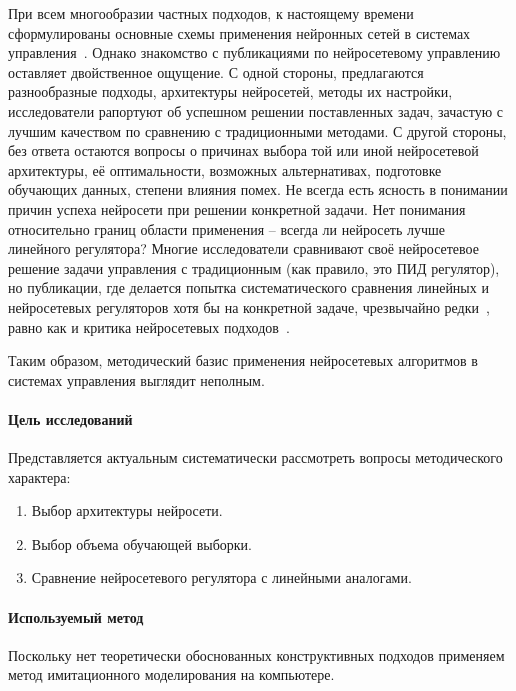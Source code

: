 При всем многообразии частных подходов, к настоящему времени
сформулированы основные схемы применения нейронных сетей в системах
управления~\cite{narpart92,park96,suykens96,terehov99,sigom00}.
Однако знакомство с публикациями по нейросетевому управлению оставляет
двойственное ощущение.  С одной стороны, предлагаются разнообразные
подходы, архитектуры нейросетей, методы их настройки, исследователи
рапортуют об успешном решении поставленных задач, зачастую с лучшим
качеством по сравнению с традиционными методами.  С другой стороны,
без ответа остаются вопросы о причинах выбора той или иной
нейросетевой архитектуры, её оптимальности, возможных альтернативах,
подготовке обучающих данных, степени влияния помех.  Не всегда есть
ясность в понимании причин успеха нейросети при решении конкретной
задачи.  Нет понимания относительно границ области применения --
всегда ли нейросеть лучше линейного регулятора?  Многие исследователи
сравнивают своё нейросетевое решение задачи управления с традиционным
(как правило, это ПИД регулятор), но публикации, где делается попытка
систематического сравнения линейных и нейросетевых регуляторов хотя бы
на конкретной задаче, чрезвычайно редки~\cite{khomyu96}, равно как и
критика нейросетевых подходов~\cite{warwick95,warwick96}.


Таким образом, методический базис применения нейросетевых алгоритмов в
системах управления выглядит неполным.

\paragraph{Цель исследований}

Представляется актуальным систематически рассмотреть вопросы
методического характера:
\begin{enumerate}
\item Выбор архитектуры нейросети.
\item Выбор объема обучающей выборки.
\item Сравнение нейросетевого регулятора с линейными аналогами.
\end{enumerate}

\paragraph{Используемый метод}

Поскольку нет теоретически обоснованных конструктивных подходов
применяем метод имитационного моделирования на компьютере.

